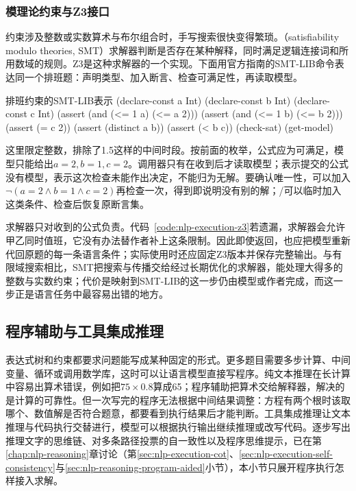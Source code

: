 \subsubsection{模理论约束与Z3接口}
\label{sec:nlp-execution-z3}

约束涉及整数或实数算术与布尔组合时，手写搜索很快变得繁琐。（satisfiability modulo theories, SMT）求解器判断是否存在某种解释，同时满足逻辑连接词和所用数域的规则。Z3是这种求解器的一个实现。下面用官方指南的SMT-LIB命令表达同一个排班题：声明类型、加入断言、检查可满足性，再读取模型。

\begin{codeblock}[label={code:nlp-execution-z3}]{排班约束的SMT-LIB表示}
(declare-const a Int)
(declare-const b Int)
(declare-const c Int)
(assert (and (<= 1 a) (<= a 2)))
(assert (and (<= 1 b) (<= b 2)))
(assert (= c 2))
(assert (distinct a b))
(assert (< b c))
(check-sat)
(get-model)
\end{codeblock}

这里限定整数，排除了1.5这样的中间时段。按前面的枚举，公式应为可满足，模型只能给出$a=2,b=1,c=2$。调用器只有在收到后才读取模型；表示提交的公式没有模型，表示这次检查未能作出决定，不能归为无解。要确认唯一性，可以加入$\lnot(a=2\land b=1\land c=2)$再检查一次，得到即说明没有别的解；/可以临时加入这类条件、检查后恢复原断言集。

求解器只对收到的公式负责。代码~\ref{code:nlp-execution-z3}若遗漏，求解器会允许甲乙同时值班，它没有办法替作者补上这条限制。因此即使返回，也应把模型重新代回原题的每一条语言条件；实际使用时还应固定Z3版本并保存完整输出。与有限域搜索相比，SMT把搜索与传播交给经过长期优化的求解器，能处理大得多的整数与实数约束；代价是映射到SMT-LIB的这一步仍由模型或作者完成，而这一步正是语言任务中最容易出错的地方。

\subsection{程序辅助与工具集成推理}
\label{sec:nlp-execution-program-aided}

表达式树和约束都要求问题能写成某种固定的形式。更多题目需要多步计算、中间变量、循环或调用数学库，这时可以让语言模型直接写程序。纯文本推理在长计算中容易出算术错误，例如把$75\times0.8$算成65；程序辅助把算术交给解释器，解决的是计算的可靠性。但一次写完的程序无法根据中间结果调整：方程有两个根时该取哪个、数值解是否符合题意，都要看到执行结果后才能判断。工具集成推理让文本推理与代码执行交替进行，模型可以根据执行输出继续推理或改写代码。逐步写出推理文字的思维链、对多条路径投票的自一致性以及程序思维提示，已在第\ref{chap:nlp-reasoning}章讨论（第\ref{sec:nlp-execution-cot}、\ref{sec:nlp-execution-self-consistency}与\ref{sec:nlp-reasoning-program-aided}小节），本小节只展开程序执行怎样接入求解。


